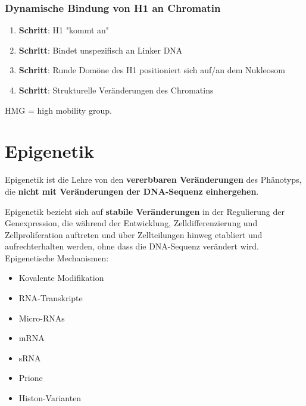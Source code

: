 \subsubsection{Dynamische Bindung von H1 an Chromatin}
\begin{enumerate}
    \item \textbf{Schritt}: H1 "kommt an"
    \item \textbf{Schritt}: Bindet unspezifisch an Linker DNA
    \item \textbf{Schritt}: Runde Domöne des H1 positioniert sich auf/an dem Nukleosom
    \item \textbf{Schritt}: Strukturelle Veränderungen des Chromatins
\end{enumerate}
HMG = high mobility group.


\section{Epigenetik}
\begin{mechanism}[title=Definition Epigenetik]
Epigenetik ist die Lehre von den \textbf{vererbbaren Veränderungen} des Phänotyps, die \textbf{nicht mit Veränderungen der DNA-Sequenz einhergehen}. 
\end{mechanism} 
\noindent Epigenetik bezieht sich auf \textbf{stabile Veränderungen} in der Regulierung der Genexpression, die während der Entwicklung, Zelldifferenzierung und Zellproliferation auftreten und über Zellteilungen hinweg etabliert und aufrechterhalten werden, ohne dass die DNA-Sequenz verändert wird.
Epigenetische Mechanismen: 
\begin{itemize}
    \item Kovalente Modifikation
    \item RNA-Transkripte
    \item Micro-RNAs
    \item mRNA 
    \item sRNA 
    \item Prione 
    \item Histon-Varianten
\end{itemize}

